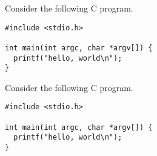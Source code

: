 \cprotEnv\begin{question}
Consider the following C program.
\begin{lstlisting}
#include <stdio.h>

int main(int argc, char *argv[]) {
  printf("hello, world\n");
}
\end{lstlisting}
\end{question}

\cprotEnv \begin{solution}
Consider the following C program.
\begin{lstlisting}
#include <stdio.h>

int main(int argc, char *argv[]) {
  printf("hello, world\n");
}
\end{lstlisting}
\end{solution}
